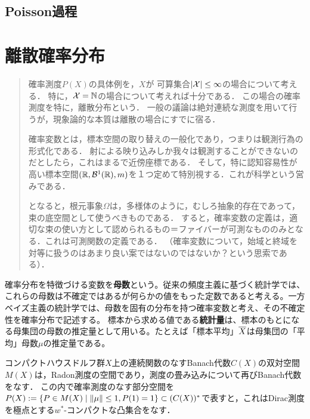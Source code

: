\documentclass[uplatex,dvipdfmx]{jsreport}
\begin{document}
\section{Poisson過程}




\chapter{離散確率分布}

\begin{quotation}
    確率測度$P(X)$の具体例を，$X$が
    可算集合$\lvert\mathcal{X}\rvert\le\infty$の場合について考える．
    特に，$\mathcal{X}=\mathbb{N}$の場合について考えれば十分である．
    この場合の確率測度を特に，離散分布という．
    一般の議論は絶対連続な測度を用いて行うが，現象論的な本質は離散の場合にすでに宿る．

    確率変数とは，標本空間の取り替えの一般化であり，つまりは観測行為の形式化である．
    射による映り込みしか我々は観測することができないのだとしたら，これはまるで近傍座標である．
    そして，特に認知容易性が高い標本空間$(\mathbb{R},\mathcal{B}^1(\mathbb{R}),m)$を１つ定めて特別視する．これが科学という営みである．
    
    となると，根元事象$\Omega$は，多様体のように，むしろ抽象的存在であって，束の底空間として使うべきものである．
    すると，確率変数の定義は，適切な束の使い方として認められるもの＝ファイバーが可測なもののみとなる．これは可測関数の定義である．
    （確率変数について，始域と終域を対等に扱うのはあまり良い案ではないのではないか？という思索である）．
\end{quotation}

\begin{remark*}[statistics]
    確率分布を特徴づける変数を\textbf{母数}という。従来の頻度主義に基づく統計学では、これらの母数は不確定ではあるが何らかの値をもった定数であると考える。一方ベイズ主義の統計学では、母数を固有の分布を持つ確率変数と考え、その不確定性を確率分布で記述する。 
    標本から求める値である\textbf{統計量}は、標本のもとになる母集団の母数の推定量として用いる。たとえば「標本平均」$\overline{X}$は母集団の「平均」母数$\mu$の推定量である。
\end{remark*}

\begin{notation}
    コンパクトハウスドルフ群$X$上の連続関数のなすBanach代数$C(X)$の双対空間$M(X)$は，Radon測度の空間であり，測度の畳み込みについて再びBanach代数をなす．
    この内で確率測度のなす部分空間を$P(X):=\left\{P\in M(X)\mid \|\mu\|\le 1,P(1)=1\right\}\subset(C(X))^*$で表すと，これはDirac測度を極点とする$w^*$-コンパクトな凸集合をなす．
\end{notation}
\end{document}
